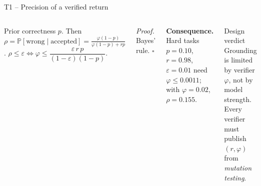 \documentclass[aspectratio=169,10pt]{beamer}
\renewcommand{\Pr}{\mathbb{P}}
\begin{document}
\begin{frame}{T1 -- Precision of a verified return}
\begin{columns}[T]
\begin{theorem}[T1]\small
Prior correctness $p$. Then
$\displaystyle\rho=\Pr[\text{wrong}\mid\text{accepted}]=\frac{\varphi(1-p)}{\varphi(1-p)+rp}$.
$\rho\le\varepsilon \iff \varphi\le\dfrac{\varepsilon\,r\,p}{(1-\varepsilon)(1-p)}$.
\end{theorem}
\small\textit{Proof.} Bayes' rule. \hfill$\square$

\vspace{3pt}
\textbf{Consequence.} Hard tasks $p{=}0.10$, $r{=}0.98$, $\varepsilon{=}0.01$ need $\varphi\le0.0011$; with $\varphi{=}0.02$, $\rho=0.155$.

\begin{alertblock}{Design verdict}
Grounding is limited by verifier $\varphi$, not by model strength. Every verifier must publish $(r,\varphi)$ from \emph{mutation testing}.
\end{alertblock}
\end{columns}
\end{frame}
\end{document}
